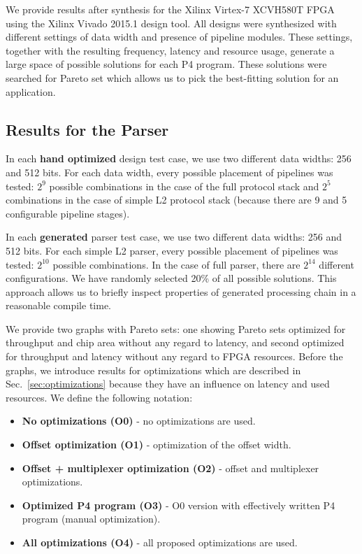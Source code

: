 We provide results after synthesis for the Xilinx Virtex-7 XCVH580T FPGA using the Xilinx Vivado 2015.1 design tool. 
All designs were synthesized with different settings of data width and presence of pipeline modules. 
These settings, together with the resulting frequency, latency and resource usage, generate a large space of
possible solutions for each P4 program. 
These solutions were searched for Pareto set which allows us to pick the best-fitting solution for an application.

\subsection{Results for the Parser}
\label{sec:exprParser}

In each \textbf{hand optimized} design test case, we
use two different data widths: 256 and 512 bits. For each data width, every possible placement of pipelines was tested: $2^{9}$ possible combinations 
in the case of the full protocol stack and $2^{5}$ combinations in the case of simple L2 protocol stack (because there are 9 and 5 configurable pipeline stages). 

In each \textbf{generated} parser test case, we use two different data widths: 256 and 512 bits. 
For each simple L2 parser, every possible placement of pipelines was tested: $2^{10}$ possible combinations. 
In the case of full parser, there are $2^{14}$ different configurations. We have randomly selected 20\% of all possible solutions.
This approach allows us to briefly inspect properties of generated processing chain in a reasonable compile time.

We provide two graphs with Pareto sets: one showing Pareto sets optimized for throughput and chip area without any regard to latency, 
and second optimized for throughput and latency without any regard to FPGA resources. 
Before the graphs, we introduce results for optimizations which are described in 
Sec.~\ref{sec:optimizations} because they have an influence on latency and used resources. We define the following notation:
\begin{itemize}
    \item \textbf{No optimizations (O0)} - no optimizations are used.
    \item \textbf{Offset optimization (O1)} - optimization of the offset width.
    \item \textbf{Offset + multiplexer optimization (O2)} - offset and multiplexer optimizations.
    \item \textbf{Optimized P4 program (O3)} - O0 version with effectively written P4 program (manual optimization).
    \item \textbf{All optimizations (O4)} - all proposed optimizations are used.
\end{itemize}

